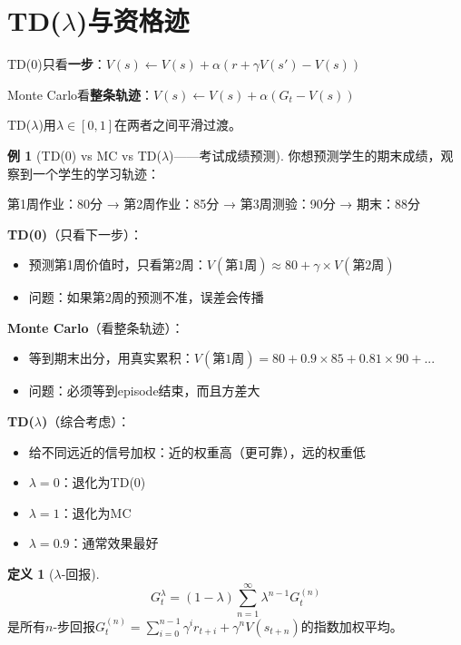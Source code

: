 \documentclass[11pt,a4paper]{article}
\theoremstyle{definition}
\newtheorem{definition}{定义}[section]
\newtheorem{example}{例}[section]
\begin{document}
\section{TD($\lambda$)与资格迹}

\begin{plainwords}
TD(0)只看\textbf{一步}：$V(s) \leftarrow V(s) + \alpha(r + \gamma V(s') - V(s))$

Monte Carlo看\textbf{整条轨迹}：$V(s) \leftarrow V(s) + \alpha(G_t - V(s))$

TD($\lambda$)用$\lambda \in [0,1]$在两者之间平滑过渡。
\end{plainwords}

\begin{example}[TD(0) vs MC vs TD($\lambda$)——考试成绩预测]
你想预测学生的期末成绩，观察到一个学生的学习轨迹：

第1周作业：80分 → 第2周作业：85分 → 第3周测验：90分 → 期末：88分

\textbf{TD(0)}（只看下一步）：
\begin{itemize}
    \item 预测第1周价值时，只看第2周：$V(\text{第1周}) \approx 80 + \gamma \times V(\text{第2周})$
    \item 问题：如果第2周的预测不准，误差会传播
\end{itemize}

\textbf{Monte Carlo}（看整条轨迹）：
\begin{itemize}
    \item 等到期末出分，用真实累积：$V(\text{第1周}) = 80 + 0.9 \times 85 + 0.81 \times 90 + ...$
    \item 问题：必须等到episode结束，而且方差大
\end{itemize}

\textbf{TD($\lambda$)}（综合考虑）：
\begin{itemize}
    \item 给不同远近的信号加权：近的权重高（更可靠），远的权重低
    \item $\lambda = 0$：退化为TD(0)
    \item $\lambda = 1$：退化为MC
    \item $\lambda = 0.9$：通常效果最好
\end{itemize}
\end{example}

\begin{definition}[$\lambda$-回报]
\[
G_t^\lambda = (1-\lambda) \sum_{n=1}^\infty \lambda^{n-1} G_t^{(n)}
\]
是所有$n$-步回报$G_t^{(n)} = \sum_{i=0}^{n-1} \gamma^i r_{t+i} + \gamma^n V(s_{t+n})$的指数加权平均。
\end{definition}
\end{document}
